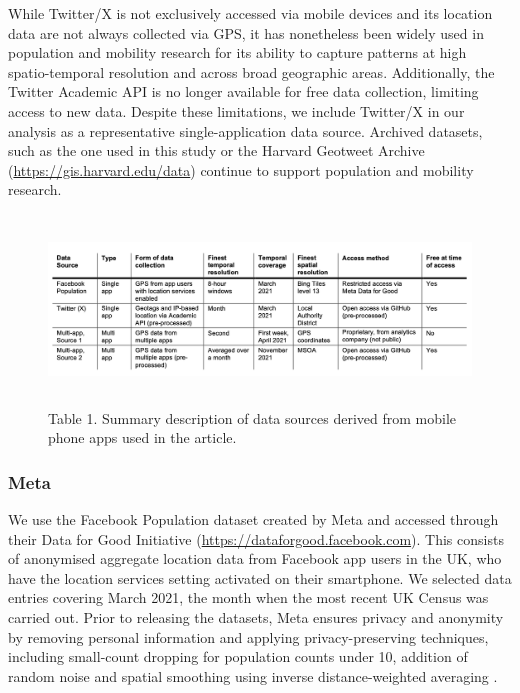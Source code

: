\documentclass[]{rsos}%
\begin{document}
While Twitter/X is not exclusively accessed via mobile devices and its location data are not always collected via GPS, it has nonetheless been widely used in population and mobility research for its ability to capture patterns at high spatio-temporal resolution and across broad geographic areas. Additionally, the Twitter Academic API is no longer available for free data collection, limiting access to new data. Despite these limitations, we include Twitter/X in our analysis as a representative single-application data source. Archived datasets, such as the one used in this study or the Harvard Geotweet Archive (\url{https://gis.harvard.edu/data}) continue to support population and mobility research.

\begin{figure}
\centering
\includegraphics[width=5.20833in,height=1.97917in]{figures/table-data-source.png}
\caption{Table 1. Summary description of data sources derived from mobile phone apps used in the
article.}
\end{figure}

\subsubsection{Meta}\label{meta}

We use the Facebook Population dataset created by Meta and accessed
through their Data for Good Initiative
(\url{https://dataforgood.facebook.com}). This consists of anonymised aggregate location data from Facebook app users in the UK, who
have the location services setting activated on their smartphone. We selected data entries covering March 2021, the month when the most recent UK Census was carried
out. Prior to releasing the datasets,
Meta ensures privacy and anonymity by removing personal information and
applying privacy-preserving techniques, including small-count dropping for population counts under 10, addition of random noise and spatial smoothing using inverse distance-weighted
averaging \citep{maas2019}.
\end{document}
